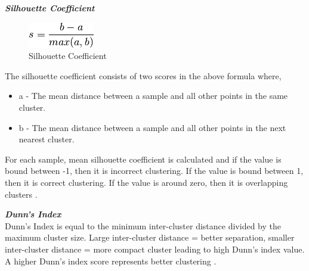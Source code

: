 \documentclass[format=sigconf]{acmart}
\begin{document}
\textit{\textbf{Silhouette Coefficient}}\\
\begin{figure}[H]
    \centering
    \includegraphics[scale=0.60]{silhouette_coefficient.png}
    \caption{Silhouette Coefficient}
    \label{fig:silc}
\end{figure}

The silhouette coefficient consists of two scores in the above formula where, 
\begin{itemize}
    \item a - The mean distance between a sample and all other points in the same cluster.
    \item b - The mean distance between a sample and all other points in the next nearest cluster.
\end{itemize}
For each sample, mean silhouette coefficient is calculated and if the value is bound between -1, then it is incorrect clustering. If
the value is bound between 1, then it is correct clustering. If the value is around zero, then it is overlapping clusters \cite{evaluationmetric}.

\textit{\textbf{Dunn's Index}} \\
Dunn’s Index is equal to the minimum inter-cluster distance divided by the maximum cluster size. 
Large inter-cluster distance = better separation, smaller inter-cluster distance = more compact cluster leading to high Dunn's index
value. A higher Dunn’s index score represents better clustering \cite{evaluationmetric}. 


\end{document}

